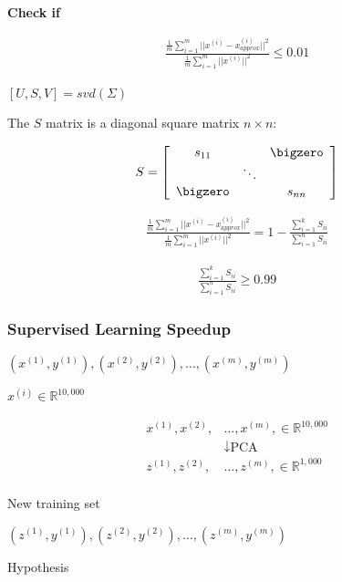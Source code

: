 \textbf{Check if}

\begin{align*}
\frac
{\frac{1}{m} \sum^m_{i=1} ||x^{(i)} - x_{approx}^{(i)}||^2}
{\frac{1}{m} \sum^m_{i=1} ||x^{(i)}||^2} \leq 0.01
\end{align*}

\([U,S,V] = svd(\Sigma)\)

The \(S\) matrix is a diagonal square matrix \(n \times n\):

\begin{align*}
S = \left[
\begin{array}{ccc}
s_{11}   &        & \bigzero \\
         & \ddots &          \\
\bigzero &        & s_{nn}   \\
\end{array}
\right]
\end{align*}

\begin{align*}
\frac
{\frac{1}{m} \sum^m_{i=1} ||x^{(i)} - x_{approx}^{(i)}||^2}
{\frac{1}{m} \sum^m_{i=1} ||x^{(i)}||^2} = 1 -
\frac
{\sum_{i=1}^k S_{ii}}
{\sum_{i=1}^n S_{ii}}
\end{align*}

\begin{align*}
\frac
{\sum_{i=1}^k S_{ii}}
{\sum_{i=1}^n S_{ii}}
\geq 0.99
\end{align*}

\hypertarget{supervised-learning-speedup}{%
\subsubsection{Supervised Learning
Speedup}\label{supervised-learning-speedup}}

\((x^{(1)},y^{(1)}),(x^{(2)},y^{(2)}),\dots,(x^{(m)},y^{(m)})\)

\(x^{(i)}\in\mathbb{R}^{10,000}\)

\begin{align*}
x^{(1)}, x^{(2)},& \dots, x^{(m)}, \in\mathbb{R}^{10,000}\\
&\downarrow \text{PCA}\\
z^{(1)}, z^{(2)},& \dots, z^{(m)}, \in\mathbb{R}^{1,000}\\
\end{align*}

New training set

\((z^{(1)},y^{(1)}),(z^{(2)},y^{(2)}),\dots,(z^{(m)},y^{(m)})\)

Hypothesis

